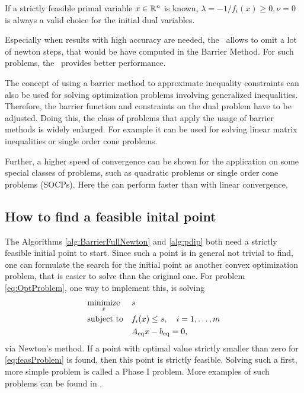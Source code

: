 \begin{remark}
	If a strictly feasible primal variable $ x \in \mathbb{R}^n $ is known, $ \lambda= -1/f_i(x) \geq 0, \nu=0 $ is always a valid choice for the initial dual variables.
\end{remark}
 
 Especially when results with high accuracy are needed, the \pdm \ allows to omit a lot of newton steps, that would be have computed in the Barrier Method. For such problems, the \pdm \ provides better performance.
 \begin{remark}
 	The concept of using a barrier method to approximate inequality constraints can also be used for solving optimization problems involving generalized inequalities. Therefore, the barrier function and constraints on the dual problem have to be adjusted. Doing this, the class of problems that apply the usage of barrier methods is widely enlarged. For example it can be used for solving linear matrix inequalities or single order cone problems.
 \end{remark}
 
 Further, a higher speed of convergence can be shown for the application on some special classes of problems, such as quadratic problems or single order cone problems (SOCPs). Here the \pdm can perform faster  than with linear convergence.
 
 
 
\subsection{How to find a feasible inital point}
The Algorithms \ref{alg:BarrierFullNewton} and \ref{alg:pdip} both need a strictly feasible initial point to start. Since such a point is in general not trivial to find, one can formulate the search for the initial point as another convex optimization problem, that is easier to solve than the original one.  
For problem \eqref{eq:OptProblem}, one way to implement this, is solving
\begin{equation}
	\begin{aligned} & \underset{x}{\text{minimize}} & & s\\ & \text{subject to} & & f_i(x) \leq s, \quad i=1,\dots,m\\ & & &{A}_{\mathrm{eq}} x - {b}_{\mathrm{eq}} = 0, \; \end{aligned}
	\label{eq:feasProblem}
\end{equation}
via Newton's method. If a point with optimal value strictly smaller than zero for \eqref{eq:feasProblem} is found, then this point is strictly feasible. Solving such a first, more simple problem is called a Phase I problem. More examples of such problems can be found in \cite{BV}.


